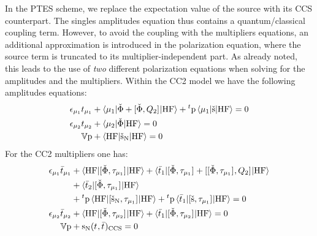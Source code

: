 In the \acrshort{PTES} scheme, we replace the expectation value of the
source with its \acrshort{CCS} counterpart. The singles amplitudes equation
thus contains a quantum/classical coupling term. However, to avoid
the coupling with the multipliers equations, an additional
approximation is introduced in the polarization equation, where the
source term is truncated to its multiplier-independent part.
As already noted, this leads to the use of \emph{two} different
polarization equations when solving for the amplitudes and the
multipliers.
Within the \acrshort{CC2} model we have the following amplitudes
equations:
\begin{subequations}\label{eq:ptes-cc2-amp}
  \begin{align}
   \epsilon_{\mu_1}t_{\mu_1} &+ \braket{\mu_1 | \check{\Phi} +
   [ \check{\Phi}, Q_2 ]^{} | \mathrm{HF}}
   + {}^t\mathrm{p}\braket{\mu_1 | \check{\mathrm{s}} | \mathrm{HF}}
             = 0 \label{eq:ptes-cc2-singles-amplitudes} \\
   \epsilon_{\mu_2}t_{\mu_2} &+ \braket{\mu_2 | \check{\Phi} | \mathrm{HF}}
             = 0 \label{eq:ptes-cc2-doubles-amplitudes} \\
    \mathbb{V}\mathrm{p} &+
    \braket{\mathrm{HF} | \check{\mathrm{s}}_{\mathrm{N}} | \mathrm{HF}} = 0
  \end{align}
\end{subequations}
For the \acrshort{CC2} multipliers one has:
\begin{subequations}\label{eq:ptes-cc2-mult}
  \begin{align}
    \epsilon_{\mu_1}\bar{t}_{\mu_1} &+
    \braket{\mathrm{HF} | [ \check{\Phi}, \tau_{\mu_1} ]^{} | \mathrm{HF}} +
    \braket{\bar{t}_{1} |
    [ \check{\Phi}, \tau_{\mu_1} ]^{}
    + [ [ \check{\Phi}, \tau_{\mu_1} ]^{}, Q_2 ]^{}
    | \mathrm{HF}}
    \nonumber \\
    &+ \braket{\bar{t}_{2} |
    [ \check{\Phi}, \tau_{\mu_1} ]^{}
    | \mathrm{HF}}
    \nonumber \\
    &+
    {}^t\mathrm{p}\braket{\mathrm{HF} | [ \check{\mathrm{s}}_\mathrm{N}, \tau_{\mu_1} ]^{} | \mathrm{HF}}
    +
    {}^t\mathrm{p}\braket{\bar{t}_{1} |
    [ \check{\mathrm{s}}, \tau_{\mu_1} ]^{} | \mathrm{HF}}
             = 0 \label{eq:ptes-cc2-singles-multipliers} \\
    \epsilon_{\mu_2}\bar{t}_{\mu_2} &+
    \braket{\mathrm{HF} | [ \check{\Phi}, \tau_{\mu_2} ]^{} | \mathrm{HF}} +
    \braket{\bar{t}_{1} |
    [ \check{\Phi}, \tau_{\mu_2} ]^{} | \mathrm{HF}}
             = 0 \label{eq:ptes-cc2-doubles-multipliers} \\
    \mathbb{V}\mathrm{p} &+ \mathrm{s}_{\mathrm{N}}(t_{}, \bar{t}_{})_\mathrm{CCS} = 0
    \label{eq:ptes-cc2-polarization-mult}
  \end{align}
\end{subequations}
